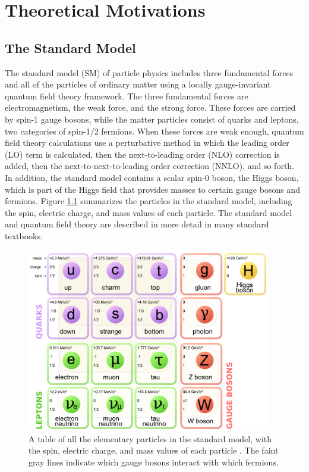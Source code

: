 \documentclass[12pt]{thesis}  %
\begin{document}
\chapter{Theoretical Motivations
\label{ch:theory}}


\section{The Standard Model}

The standard model (SM) of particle physics includes three fundamental forces and all of the particles of ordinary matter using a locally gauge-invariant quantum field theory framework. The three fundamental forces are electromagnetism, the weak force, and the strong force. These forces are carried by spin-1 gauge bosons, while the matter particles consist of quarks and leptons, two categories of spin-1/2 fermions. When these forces are weak enough, quantum field theory calculations use a perturbative method in which the leading order (LO) term is calculated, then the next-to-leading order (NLO) correction is added, then the next-to-next-to-leading order correction (NNLO), and so forth. In addition, the standard model contains a scalar spin-0 boson, the Higgs boson, which is part of the Higgs field that provides masses to certain gauge bosons and fermions. Figure \ref{fig:sm-particles} summarizes the particles in the standard model, including the spin, electric charge, and mass values of each particle. The standard model and quantum field theory are described in more detail in many standard textbooks.

\begin{figure}[hbt]
\begin{center}
\includegraphics[width=0.95\textwidth]{figures/Standard_Model_of_Elementary_Particles.pdf}
\caption{A table of all the elementary particles in the standard model, with the spin, electric charge, and mass values of each particle \cite{MissMJ}. The faint gray lines indicate which gauge bosons interact with which fermions.}
\label{fig:sm-particles}
\end{center}
\end{figure}
\end{document}
